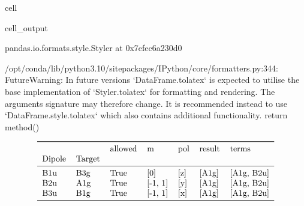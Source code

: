 \documentclass[letterpaper,table,10pt,english]{jupyterBook}
\begin{document}
\begin{sphinxuseclass}{cell}
\begin{sphinxVerbatimOutput}
\begin{sphinxuseclass}{cell_output}
\begin{sphinxVerbatim}[commandchars=\\\{\}]
\PYGZlt{}pandas.io.formats.style.Styler at 0x7efec6a230d0\PYGZgt{}
\end{sphinxVerbatim}

\begin{sphinxVerbatim}[commandchars=\\\{\}]
/opt/conda/lib/python3.10/site\PYGZhy{}packages/IPython/core/formatters.py:344: FutureWarning: In future versions `DataFrame.to\PYGZus{}latex` is expected to utilise the base implementation of `Styler.to\PYGZus{}latex` for formatting and rendering. The arguments signature may therefore change. It is recommended instead to use `DataFrame.style.to\PYGZus{}latex` which also contains additional functionality.
  return method()
\end{sphinxVerbatim}
\begin{equation*}
\begin{split}\begin{tabular}{lllllll}
\toprule
    &     & allowed &        m &  pol & result &       terms \\
Dipole & Target &         &          &      &        &             \\
\midrule
B1u & B3g &    True &      [0] &  [z] &  [A1g] &  [A1g, B2u] \\
B2u & A1g &    True &  [-1, 1] &  [y] &  [A1g] &  [A1g, B2u] \\
B3u & B1g &    True &  [-1, 1] &  [x] &  [A1g] &  [A1g, B2u] \\
\bottomrule
\end{tabular}\end{split}
\end{equation*}
\end{sphinxuseclass}\end{sphinxVerbatimOutput}

\end{sphinxuseclass}
\end{document}
